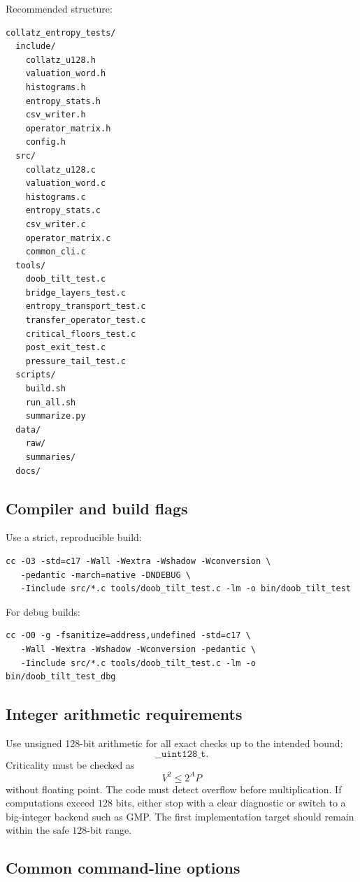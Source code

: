 \documentclass[11pt]{article}
\begin{document}
Recommended structure:
\begin{verbatim}
collatz_entropy_tests/
  include/
    collatz_u128.h
    valuation_word.h
    histograms.h
    entropy_stats.h
    csv_writer.h
    operator_matrix.h
    config.h
  src/
    collatz_u128.c
    valuation_word.c
    histograms.c
    entropy_stats.c
    csv_writer.c
    operator_matrix.c
    common_cli.c
  tools/
    doob_tilt_test.c
    bridge_layers_test.c
    entropy_transport_test.c
    transfer_operator_test.c
    critical_floors_test.c
    post_exit_test.c
    pressure_tail_test.c
  scripts/
    build.sh
    run_all.sh
    summarize.py
  data/
    raw/
    summaries/
  docs/
\end{verbatim}

\subsection{Compiler and build flags}

Use a strict, reproducible build:
\begin{lstlisting}
cc -O3 -std=c17 -Wall -Wextra -Wshadow -Wconversion \
   -pedantic -march=native -DNDEBUG \
   -Iinclude src/*.c tools/doob_tilt_test.c -lm -o bin/doob_tilt_test
\end{lstlisting}

For debug builds:
\begin{lstlisting}
cc -O0 -g -fsanitize=address,undefined -std=c17 \
   -Wall -Wextra -Wshadow -Wconversion -pedantic \
   -Iinclude src/*.c tools/doob_tilt_test.c -lm -o bin/doob_tilt_test_dbg
\end{lstlisting}

\subsection{Integer arithmetic requirements}

Use unsigned 128-bit arithmetic for all exact checks up to the intended bound:
\[
  \texttt{\_\_uint128\_t}.
\]
Criticality must be checked as
\[
  V^2\le 2^A P
\]
without floating point. The code must detect overflow before multiplication. If computations exceed $128$ bits, either stop with a clear diagnostic or switch to a big-integer backend such as GMP. The first implementation target should remain within the safe $128$-bit range.

\subsection{Common command-line options}
\end{document}
